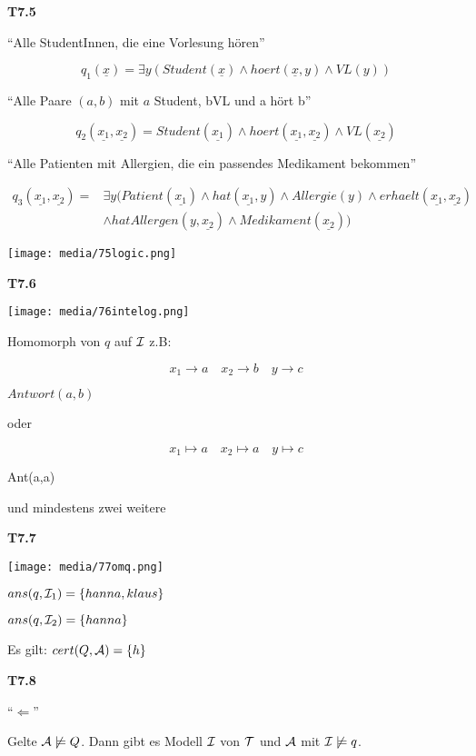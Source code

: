 \textbf{T7.5}

"`Alle StudentInnen, die eine Vorlesung hören"'

$$q_1(\underline{x}) = \exists y (Student(\underline{x}) \wedge hoert(\underline{x},y) \wedge VL(y))$$

"`Alle Paare $(a,b)$ mit $a$ Student, bVL und a hört b"'

$$q_2(\underline{x_1},\underline{x_2}) = Student(\underline{x_1}) \wedge hoert(\underline{x_1},\underline{x_2}) \wedge VL(\underline{x_2})$$

"`Alle Patienten mit Allergien, die ein passendes Medikament bekommen"'

\begin{equation}
\begin{split}
q_3(\underline{x_1}, \underline{x_2}) =& \exists y (Patient(\underline{x_1}) \wedge hat(\underline{x_1},y) \wedge Allergie(y) \wedge erhaelt(\underline{x_1},\underline{x_2}) \\
& \wedge hatAllergen(y,\underline{x_2}) \wedge Medikament(\underline{x_2}))
\end{split}
\end{equation}

\texttt{[image: media/75logic.png]}

\textbf{T7.6}

\texttt{[image: media/76intelog.png]}

Homomorph von $q$ auf $\mathcal{I}$ z.B:

$$x_1 \rightarrow a \quad x_2 \rightarrow b \quad y \rightarrow c$$

$Antwort(a,b)$

oder 

$$x_1 \mapsto a \quad x_2 \mapsto a \quad y \mapsto c$$

Ant(a,a)

und mindestens zwei weitere

\textbf{T7.7}

\texttt{[image: media/77omq.png]}

$ans(q, \mathcal{I}_1) = \{hanna,klaus\}$

$ans(q, \mathcal{I}_2) = \{hanna\}$

Es gilt: $cert(Q, \mathcal{A}) = \{h\}$

\textbf{T7.8}

"`$\Leftarrow$"'

Gelte $\mathcal{A} \not\models Q$. Dann gibt es Modell $\mathcal{I}$ von $\mathcal{T}$ und $\mathcal{A}$ mit $\mathcal{I} \not\models q$.

